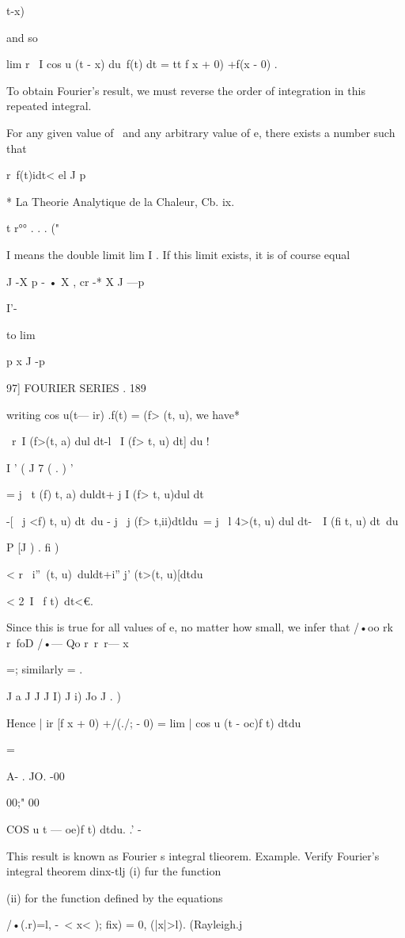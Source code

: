 { t-x)

and so

lim r \ I cos u (t - x) du\ f(t) dt = tt f x + 0) +f(x - 0) .

To obtain Fourier's result, we must reverse the order of integration
in this repeated integral.

For any given value of \ and any arbitrary value of e, there exists a
number such that

r\ f(t)idt< el J p

* La Theorie Analytique de la Chaleur, Cb. ix.

t r°° . . . ("

I means the double limit lim I . If this limit exists, it is of course
equal

J -X p - • X , cr -* X J —p

I'-

to lim

p x J -p

97] FOURIER SERIES . 189

writing cos u(t— ir) .f(t) = (f> (t, u), we have*

\ r\ I (f>(t, a) dul dt-l \ I (f> t, u) dt] du !

I ' ( J 7 ( . ) '

= j \ t (f) t, a) duldt+ j I (f> t, u)dul dt

-[ \ j <f) t, u) dt\ du - j \ j (f> t,ii)dtldu\ = j \ l 4>(t, u) dul
dt-\ \ I (fi t, u) dt\ du

  P [J ) . fi )

< r \ i''\ < t>(t, u)\ duldt+i'' j' (t>(t, u)[dtdu

< 2\ I \ f t)\ dt<€.

Since this is true for all values of e, no matter how small, we infer
that /•oo rk r\ foD /•— Qo r\ r\ r— x

=; similarly = .

J a J J J I) J i) Jo J . )

Hence | ir [f x + 0) +/(./; - 0) = lim | cos u (t - oc)f t) dtdu

=

A- . JO. -00

00;" 00

COS u t — oe)f t) dtdu. .' -

This result is known as Fourier s integral tlieorem. Example. Verify
Fourier's integral theorem dinx-tlj (i) fur the function

(ii) for the function defined by the equations

/•(.r)=l, -\ < x< ); fix) = 0, (|x|>l). (Rayleigh.j

}
